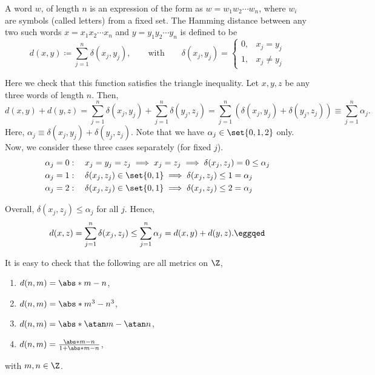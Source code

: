 \begin{negg}
  A word $w$, of length $n$ is an expression of the form as $w=w_1 w_2 \cdots w_n$, where $w_i$ are symbols (called letters) from a fixed set. The Hamming distance between any two such words $x=x_1 x_2 \cdots x_n$ and $y=y_1 y_2 \cdots y_n$ is defined to be
  \begin{equation*}
    d(x,y) \coloneqq \sum_{j=1}^{n} \delta(x_j, y_j),
    \qquad\text{with}\qquad
    \delta(x_j, y_j) = \begin{cases}
    0, & x_j = y_j\\
    1, & x_j \neq y_j
    \end{cases}
  \end{equation*}

  Here we check that this function satisfies the triangle inequality. Let $x,y,z$ be any three words of length $n$. Then,
  \begin{equation*}
    d(x,y) + d(y,z)
    = \sum_{j=1}^{n} \delta(x_j, y_j) + \sum_{j=1}^{n} \delta(y_j, z_j)
    = \sum_{j=1}^{n} \left(\delta(x_j, y_j) + \delta(y_j, z_j)\right)
    \equiv \sum_{j=1}^{n} \alpha_j.
  \end{equation*}
  Here, $\alpha_j \equiv \delta(x_j, y_j) + \delta(y_j, z_j)$. Note that we have $\alpha_j \in \set{0,1,2}$ only. Now, we consider these three cases separately (for fixed $j$).
  \begin{align*}
    \alpha_j &= 0:\quad x_j = y_j = z_j \implies x_j = z_j \implies \delta(x_j, z_j) = 0 \leq \alpha_j\\
    \alpha_j &= 1:\quad \delta(x_j, z_j) \in \set{0,1} \implies \delta(x_j, z_j) \leq 1 = \alpha_j\\
    \alpha_j &= 2:\quad \delta(x_j, z_j) \in \set{0,1} \implies \delta(x_j, z_j) \leq 2 = \alpha_j
  \end{align*}

  Overall, $\delta(x_j, z_j) \leq \alpha_j$ for all $j$. Hence,
  \begin{equation*}
    d(x,z) = \sum_{j=1}^{n} \delta(x_j, z_j) \leq \sum_{j=1}^{n} \alpha_j = d(x,y) + d(y,z).\eggqed
  \end{equation*}
\end{negg}

\begin{negg}
  It is easy to check that the following are all metrics on $\Z$,
  \begin{enumerate}
  \item $d(n,m) = \abs*{m-n}$,
  \item $d(n,m) = \abs*{m^3 - n^3}$,
  \item $d(n,m) = \abs*{\atan m - \atan n}$,
  \item $d(n,m) = \frac{\abs*{m-n}}{1 + \abs*{m-n}}$,
  \end{enumerate}
  with $m,n \in \Z$. \eggqed
\end{negg}

